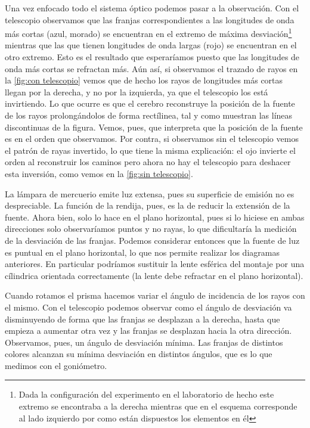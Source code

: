 \documentclass[12pt]{article}
\numberwithin{table}{section}
\numberwithin{figure}{section}
\numberwithin{equation}{section}
\begin{document}
Una vez enfocado todo el sistema óptico podemos pasar a la observación. Con el telescopio observamos que las franjas correspondientes a las longitudes de onda más cortas (azul, morado) se encuentran en el extremo de máxima desviación\footnote{Dada la configuración del experimento en el laboratorio de hecho este extremo se encontraba a la derecha mientras que en el esquema corresponde al lado izquierdo por como están dispuestos los elementos en él} mientras que las que tienen longitudes de onda largas (rojo) se encuentran en el otro extremo. Esto es el resultado que esperaríamos puesto que las longitudes de onda más cortas se refractan más. Aún así, si observamos el trazado de rayos en la \cref{fig:con telescopio} vemos que de hecho los rayos de longitudes más cortas llegan por la derecha, y no por la izquierda, ya que el telescopio los está invirtiendo. Lo que ocurre es que el cerebro reconstruye la posición de la fuente de los rayos prolongándolos de forma rectílinea, tal y como muestran las líneas discontinuas de la figura. Vemos, pues, que interpreta que la posición de la fuente es en el orden que observamos. Por contra, si observamos sin el telescopio vemos el patrón de rayas invertido, lo que tiene la misma explicación: el ojo invierte el orden al reconstruir los caminos pero ahora no hay el telescopio para deshacer esta inversión, como vemos en la \cref{fig:sin telescopio}.   

La lámpara de mercuerio emite luz extensa, pues su superficie de emisión no es despreciable. La función de la rendija, pues, es la de reducir la extensión de la fuente. Ahora bien, solo lo hace en el plano horizontal, pues si lo hiciese en ambas direcciones solo observaríamos puntos y no rayas, lo que dificultaría la medición de la desviación de las franjas. Podemos considerar entonces que la fuente de luz es puntual en el plano horizontal, lo que nos permite realizar los diagramas anteriores. En particular podríamos sustituir la lente esférica del montaje por una cílindrica orientada correctamente (la lente debe refractar en el plano horizontal). 

Cuando rotamos el prisma hacemos variar el ángulo de incidencia de los rayos con el mismo. Con el telescopio podemos observar como el ángulo de desviación va disminuyendo de forma que las franjas se desplazan a la derecha, hasta que empieza a aumentar otra vez y las franjas se desplazan hacia la otra dirección. Observamos, pues, un ángulo de desviación mínima. Las franjas de distintos colores alcanzan su mínima desviación en distintos ángulos, que es lo que medimos con el goniómetro.
\end{document}

